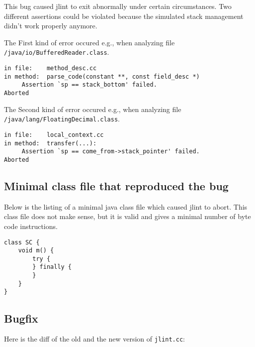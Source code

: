 \documentclass[11pt,twoside,a4paper,draft]{article}
\begin{document}
This bug caused jlint to exit abnormally under certain circumstances.
Two different assertions could be violated because the simulated stack
management didn't work properly anymore. 

The First kind of error occured e.g., when analyzing file \newline
\texttt{/java/io/BufferedReader.class}.

\begin{verbatim}
in file:    method_desc.cc
in method:  parse_code(constant **, const field_desc *)
	 Assertion `sp == stack_bottom' failed.
Aborted
\end{verbatim}

The Second kind of error occured e.g., when analyzing file \newline
\texttt{/java/lang/FloatingDecimal.class}.

\begin{verbatim}
in file:    local_context.cc
in method:  transfer(...):
	 Assertion `sp == come_from->stack_pointer' failed.
Aborted 
\end{verbatim}

\subsection {Minimal class file that reproduced the bug}

Below is the listing of a minimal java class file which caused jlint to abort.
This class file does not make sense, but it is valid and gives a minimal
number of byte code instructions. 

\begin{verbatim}
class SC {
    void m() {
        try {
        } finally {
        }
    }
}
\end{verbatim}


\subsection {Bugfix}

Here is the diff of the old and the new version of \texttt{jlint.cc}:
\end{document}
